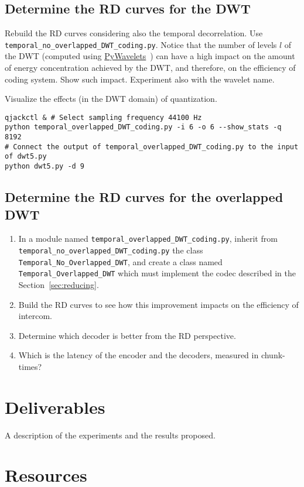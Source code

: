 \subsection{Determine the RD curves for the DWT}

Rebuild the RD curves considering also the temporal decorrelation. Use
\verb|temporal_no_overlapped_DWT_coding.py|. Notice that the number of
levels $l$ of the DWT (computed using
\href{https://pywavelets.readthedocs.io/en/latest/}{PyWavelets}~\cite{lee2019pywavelets})
can have a high impact on the amount of energy concentration achieved
by the DWT, and therefore, on the efficiency of coding system. Show
such impact. Experiment also with the wavelet name.

Visualize the effects (in the DWT domain) of quantization.
\begin{verbatim}
qjackctl & # Select sampling frequency 44100 Hz 
python temporal_overlapped_DWT_coding.py -i 6 -o 6 --show_stats -q 8192
# Connect the output of temporal_overlapped_DWT_coding.py to the input of dwt5.py
python dwt5.py -d 9
\end{verbatim}


\subsection{Determine the RD curves for the overlapped DWT}

\begin{enumerate}
\item In a module named \verb|temporal_overlapped_DWT_coding.py|,
  inherit from \verb|temporal_no_overlapped_DWT_coding.py| the class
  \verb|Temporal_No_Overlapped_DWT|, and create a class named
  \verb|Temporal_Overlapped_DWT| which must implement the codec
  described in the Section~\ref{sec:reducing}.
\item Build the RD curves to see how this improvement impacts on the
  efficiency of intercom.
\item Determine which decoder is better from the RD perspective.
\item Which is the latency of the encoder and the decoders, measured
  in chunk-times?
\end{enumerate}



\section{Deliverables}
A description of the experiments and the results proposed.

\section{Resources}


